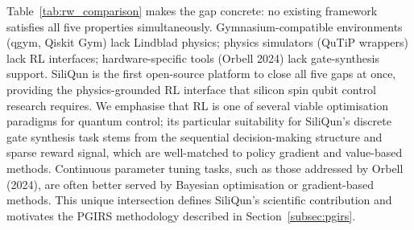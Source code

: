 Table~\ref{tab:rw_comparison} makes the gap concrete: no existing framework satisfies all five properties simultaneously. Gymnasium-compatible environments (qgym, Qiskit Gym) lack Lindblad physics; physics simulators (QuTiP wrappers) lack RL interfaces; hardware-specific tools (Orbell 2024) lack gate-synthesis support. SiliQun is the first open-source platform to close all five gaps at once, providing the physics-grounded RL interface that silicon spin qubit control research requires. We emphasise that RL is one of several viable optimisation paradigms for quantum control; its particular suitability for SiliQun's discrete gate synthesis task stems from the sequential decision-making structure and sparse reward signal, which are well-matched to policy gradient and value-based methods. Continuous parameter tuning tasks, such as those addressed by Orbell (2024), are often better served by Bayesian optimisation or gradient-based methods. This unique intersection defines SiliQun's scientific contribution and motivates the PGIRS methodology described in Section~\ref{subsec:pgirs}.

